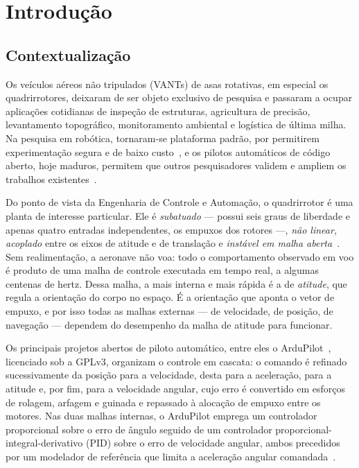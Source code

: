 \chapter{Introdução}
\label{cap:introducao}

\section{Contextualização}
\label{sec:contextualizacao}

Os veículos aéreos não tripulados (VANTs) de asas rotativas, em especial os
quadrirrotores, deixaram de ser objeto exclusivo de pesquisa e passaram a
ocupar aplicações cotidianas de inspeção de estruturas, agricultura de
precisão, levantamento topográfico, monitoramento ambiental e logística de
última milha. Na pesquisa em robótica, tornaram-se plataforma padrão, por
permitirem experimentação segura e de baixo custo~\cite{mahony2012}, e os
pilotos automáticos de código aberto, hoje maduros, permitem que outros
pesquisadores validem e ampliem os trabalhos existentes~\cite{ebeid2018}.

Do ponto de vista da Engenharia de Controle e Automação, o quadrirrotor é uma
planta de interesse particular. Ele é \emph{subatuado} --- possui seis graus
de liberdade e apenas quatro entradas independentes, os empuxos dos rotores
---, \emph{não linear}, \emph{acoplado} entre os eixos de atitude e de
translação e \emph{instável em malha aberta}~\cite{bouabdallah2007,beard2008}.
Sem realimentação, a aeronave não voa: todo o comportamento observado em voo é
produto de uma malha de controle executada em tempo real, a algumas centenas
de hertz. Dessa malha, a mais interna e mais rápida é a de \emph{atitude}, que
regula a orientação do corpo no espaço. É a orientação que aponta o vetor de
empuxo, e por isso todas as malhas externas --- de velocidade, de posição, de
navegação --- dependem do desempenho da malha de atitude para funcionar.

Os principais projetos abertos de piloto automático, entre eles o
ArduPilot~\cite{ardupilot2026}, licenciado sob a GPLv3, organizam o controle
em cascata: o comando é refinado sucessivamente da posição para a velocidade,
desta para a aceleração, para a atitude e, por fim, para a velocidade angular,
cujo erro é convertido em esforços de rolagem, arfagem e guinada e repassado à
alocação de empuxo entre os motores. Nas duas malhas internas, o ArduPilot
emprega um controlador proporcional sobre o erro de ângulo seguido de um
controlador proporcional-integral-derivativo (PID) sobre o erro de velocidade
angular, ambos precedidos por um modelador de referência que limita a
aceleração angular comandada~\cite{ardupilotdev,ardupilot2026}.

